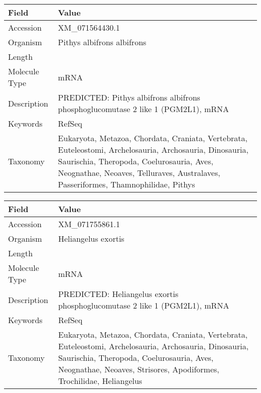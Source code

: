 \documentclass[10pt]{article}
\begin{document}
\vspace{1em}
{\footnotesize
\begin{longtable}{>{\raggedright\arraybackslash}p{4.5cm} >{\raggedright\arraybackslash}p{11.5cm}}
\textbf{Field} & \textbf{Value} \\
\hline
Accession & XM\_071564430.1 \\
Organism & Pithys albifrons albifrons \\
Length & 5849 \\
Molecule Type & mRNA \\
Description & PREDICTED: Pithys albifrons albifrons phosphoglucomutase 2 like 1 (PGM2L1), mRNA \\
Keywords & RefSeq \\
Taxonomy & Eukaryota, Metazoa, Chordata, Craniata, Vertebrata, Euteleostomi, Archelosauria, Archosauria, Dinosauria, Saurischia, Theropoda, Coelurosauria, Aves, Neognathae, Neoaves, Telluraves, Australaves, Passeriformes, Thamnophilidae, Pithys \\
\end{longtable}
}

\vspace{1em}
{\footnotesize
\begin{longtable}{>{\raggedright\arraybackslash}p{4.5cm} >{\raggedright\arraybackslash}p{11.5cm}}
\textbf{Field} & \textbf{Value} \\
\hline
Accession & XM\_071755861.1 \\
Organism & Heliangelus exortis \\
Length & 7899 \\
Molecule Type & mRNA \\
Description & PREDICTED: Heliangelus exortis phosphoglucomutase 2 like 1 (PGM2L1), mRNA \\
Keywords & RefSeq \\
Taxonomy & Eukaryota, Metazoa, Chordata, Craniata, Vertebrata, Euteleostomi, Archelosauria, Archosauria, Dinosauria, Saurischia, Theropoda, Coelurosauria, Aves, Neognathae, Neoaves, Strisores, Apodiformes, Trochilidae, Heliangelus \\
\end{longtable}
}
\end{document}
